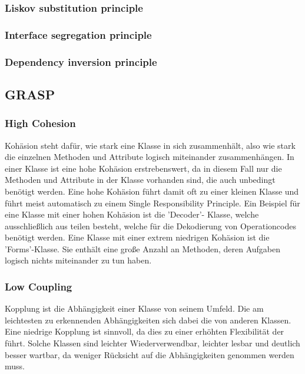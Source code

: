 \documentclass[12pt,a4paper,titlepage,ngerman,pdftex]{report}
\begin{document}
	\subsubsection{Liskov substitution principle}
	
	\subsubsection{Interface segregation principle}
	
	\subsubsection{Dependency inversion principle}
	
	\subsection{GRASP}
	
	\subsubsection{High Cohesion}
	
	Kohäsion steht dafür, wie stark eine Klasse in sich zusammenhält, also wie stark die einzelnen Methoden und Attribute logisch miteinander zusammenhängen. In einer Klasse ist eine hohe Kohäsion erstrebenswert, da in diesem Fall nur die Methoden und Attribute in der Klasse vorhanden sind, die auch unbedingt benötigt werden.
	Eine hohe Kohäsion führt damit oft zu einer kleinen Klasse und führt meist automatisch zu einem Single Responsibility Principle. Ein Beispiel für eine Klasse mit einer hohen Kohäsion ist die 'Decoder'- Klasse, welche ausschließlich aus teilen besteht, welche für die Dekodierung von Operationcodes benötigt werden. 
	Eine Klasse mit einer extrem niedrigen Kohäsion ist die 'Forms'-Klasse. Sie enthält eine große Anzahl an Methoden, deren Aufgaben logisch nichts miteinander zu tun haben.  
	
	\subsubsection{Low Coupling}
	
	Kopplung ist die Abhängigkeit einer Klasse von seinem Umfeld. Die am leichtesten zu erkennenden Abhängigkeiten sich dabei die von anderen Klassen. Eine niedrige Kopplung ist sinnvoll, da dies zu einer erhöhten Flexibilität der führt. Solche Klassen sind leichter Wiederverwendbar, leichter lesbar und deutlich besser wartbar, da weniger Rücksicht auf die Abhängigkeiten genommen werden muss. 
	
\end{document}
